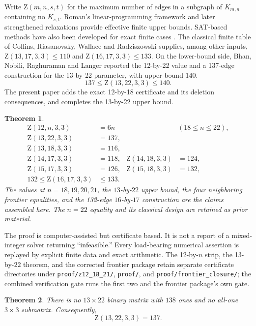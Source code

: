 \documentclass[11pt]{amsart}
\newtheorem{theorem}{Theorem}[section]
\newcommand{\Z}{\mathrm Z}
\begin{document}
Write $\Z(m,n,s,t)$ for the maximum number of edges in a subgraph of $K_{m,n}$ containing no $K_{s,t}$. Roman's linear-programming framework \cite{Roman1975} and later strengthened relaxations \cite{DaviesGillHorsley2026} provide effective finite upper bounds. SAT-based methods have also been developed for exact finite cases \cite{Tan2022}. The classical finite table of Collins, Riasanovsky, Wallace and Radziszowski \cite{CollinsRiasanovskyWallaceRadziszowski2016} supplies, among other inputs, $\Z(13,17,3,3)\le110$ and $\Z(16,17,3,3)\le133$. On the lower-bound side, Bhan, Nobili, Raghuraman and Langer \cite{BhanNobiliLanger2026} reported the 12-by-22 value and a 137-edge construction for the 13-by-22 parameter, with upper bound 140.
\[
  137\le \Z(13,22,3,3)\le140.
\]
The present paper adds the exact 12-by-18 certificate and its deletion consequences, and completes the 13-by-22 upper bound.

\begin{theorem}\label{thm:combined}
\begin{align*}
\Z(12,n,3,3)&=6n &&(18\le n\le22),\\
\Z(13,22,3,3)&=137,\\
\Z(13,18,3,3)&=116,\\
\Z(14,17,3,3)&=118, & \Z(14,18,3,3)&=124,\\
\Z(15,17,3,3)&=126, & \Z(15,18,3,3)&=132,\\
132\le\Z(16,17,3,3)&\le133.
\end{align*}
The values at $n=18,19,20,21$, the $13$-by-$22$ upper bound, the four
neighboring frontier equalities, and the 132-edge $16$-by-$17$ construction
are the claims assembled here. The $n=22$ equality and its classical design
are retained as prior material.
\end{theorem}

The proof is computer-assisted but certificate based. It is not a report of a mixed-integer solver returning ``infeasible.'' Every load-bearing numerical assertion is replayed by explicit finite data and exact arithmetic. The 12-by-$n$ strip, the 13-by-$22$ theorem, and the corrected frontier package retain separate certificate directories under \texttt{proof/z12\_18\_21/}, \texttt{proof/}, and \texttt{proof/frontier\_closure/}; the combined verification gate runs the first two and the frontier package's own gate.

\begin{theorem}\label{thm:13}
There is no $13\times22$ binary matrix with $138$ ones and no all-one $3\times3$ submatrix. Consequently,
\[
  \boxed{\Z(13,22,3,3)=137}.
\]
\end{theorem}
\end{document}
